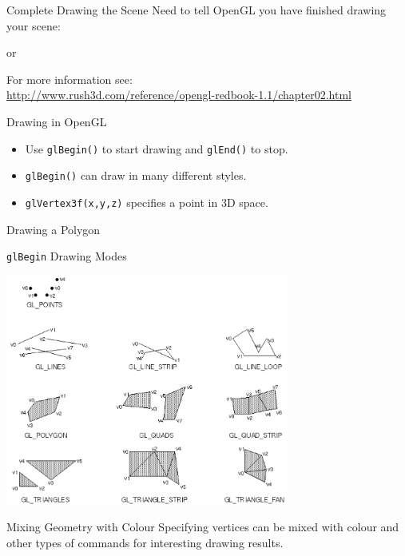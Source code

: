\documentclass[xcolor=dvipsnames,t]{beamer}
\newcommand{\showcode}[1]{\begin{mdframed}[style=code] %
                          \end{mdframed}%
}
\begin{document}
\begin{frame}{Complete Drawing the Scene} 
    Need to tell OpenGL you have finished drawing your scene:
    \showcode{glfinish.c} 
    or
    \showcode{glflush.c} 
    For more information see:\\
    \small
    \url{http://www.rush3d.com/reference/opengl-redbook-1.1/chapter02.html}
    \normalsize
\end{frame} 

\begin{frame}{Drawing in OpenGL}
    \begin{itemize} 
        \item Use \texttt{glBegin()} to start drawing and \texttt{glEnd()} to stop.
        \item \texttt{glBegin()} can draw in many different styles.
        \item \texttt{glVertex3f(x,y,z)} specifies a point in 3D space.
    \end{itemize} 
    \begin{block}{Drawing a Polygon} 
        \showcode{polygon.c} 
    \end{block} 
\end{frame} 

\begin{frame}{\texttt{glBegin} Drawing Modes}  
    \begin{center} 
         \includegraphics[width=0.7\textwidth]{glbegin} 
    \end{center} 
\end{frame} 

\begin{frame}{Mixing Geometry with Colour} 
    Specifying vertices can be mixed with colour and other 
    types of commands for interesting drawing results.
    \showcode{geomcolor.c} 
\end{frame} 
\end{document}
